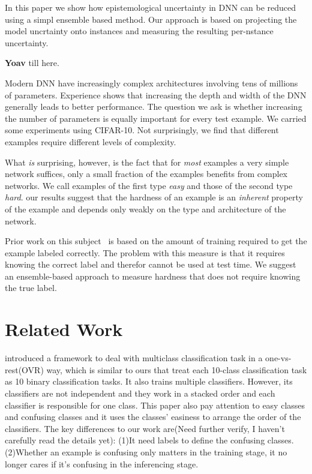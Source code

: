 \documentclass{article}
\begin{document}
In this paper we show how epistemological uncertainty in DNN can be reduced using a simpl ensemble based method. Our approach is based on projecting the model uncrtainty onto instances and measuring the resulting per-nstance uncertainty.

{\bf Yoav} till here.


Modern DNN have increasingly complex architectures involving tens of millions of parameters. Experience shows that increasing the depth and width of the DNN generally leads to better performance. The question we ask is whether increasing the number of parameters is equally important for every test example. We carried some experiments using CIFAR-10. Not surprisingly, we find that different examples require different levels of complexity. 

What {\em is} surprising, however, is the fact that for {\em most} examples a very simple network suffices, only a small fraction of the examples benefits from complex networks. We call examples of the first type {\em easy} and those of the second type {\em hard}. our results suggest that the hardness of an example is an {\em inherent} property of the example and depends only weakly on the type and architecture of the network.

Prior work on this subject~\cite{} is based on the amount of training required to get the example labeled correctly. The problem with this measure is that it requires knowing the correct label and therefor cannot be used at test time. We suggest an ensemble-based approach to measure hardness that does not require knowing the true label.


\section{Related Work}
\cite{stacked_ovr}introduced a framework to deal with multiclass classification task in a one-vs-rest(OVR) way, which is similar to ours that treat each 10-class classification task as 10 binary classification tasks. It also trains multiple classifiers. However, its classifiers are not independent and they work in a stacked order and each classifier is responsible for one class. This paper also pay attention to easy classes and confusing classes and it uses the classes’ easiness to arrange the order of the classifiers.
The key differences to our work are(Need further verify, I haven’t carefully read the details yet): (1)It need labels to define the confusing classes. (2)Whether an example is confusing only matters in the training stage, it no longer cares if it’s confusing in the inferencing stage.
\end{document}
